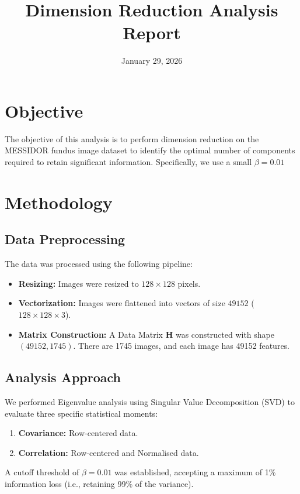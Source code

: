 \documentclass[a4paper,11pt]{article}
\title{\textbf{Dimension Reduction Analysis Report}}
\date{January 29, 2026}
\begin{document}
\maketitle

\section{Objective}
The objective of this analysis is to perform dimension reduction on the MESSIDOR fundus image dataset to identify the optimal number of components required to retain significant information. Specifically, we use a small $\beta =0.01$ 

\section{Methodology}

\subsection{Data Preprocessing}
The data was processed using the following pipeline:
\begin{itemize}
    \item \textbf{Resizing:} Images were resized to $128 \times 128$ pixels.
    \item \textbf{Vectorization:} Images were flattened into vectors of size $49152$ ($128 \times 128 \times 3$).
    \item \textbf{Matrix Construction:} A Data Matrix $\mathbf{H}$ was constructed with shape $(49152, 1745)$. There are 1745 images, and each image has 49152 features.
\end{itemize}

\subsection{Analysis Approach}
We performed Eigenvalue analysis using Singular Value Decomposition (SVD) to evaluate three specific statistical moments:
\begin{enumerate}
    \item \textbf{Covariance:} Row-centered data.
    \item \textbf{Correlation:} Row-centered and Normalised data.
\end{enumerate}

A cutoff threshold of $\beta = 0.01$ was established, accepting a maximum of 1\% information loss (i.e., retaining 99\% of the variance).
\end{document}

